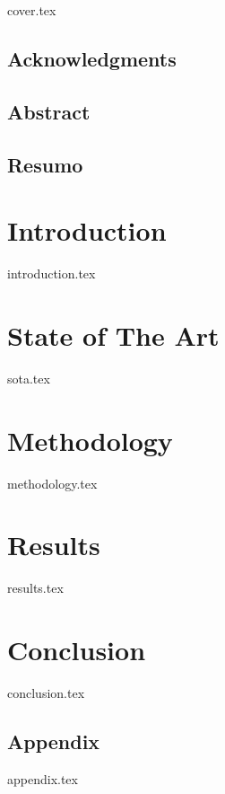 \documentclass[a4paper, 12pt]{report}
\begin{document}
{cover.tex}
\newpage
\printglossary[type=\acronymtype]

\newpage
\listoffigures

\newpage
\listoftables

\newpage
\tableofcontents
\frontmatter
\section*{Acknowledgments}

\newpage
\section*{Abstract}

\newpage
\section*{Resumo}

\mainmatter


\newpage
\chapter{Introduction}
{introduction.tex}

\newpage
\chapter{State of The Art}
{sota.tex}

\newpage
\chapter{Methodology}
{methodology.tex}

\newpage
\chapter{Results}
{results.tex}

\newpage
\chapter{Conclusion}
{conclusion.tex}

\newpage
\printbibliography

\newpage
\section*{Appendix}
{appendix.tex}
\end{document}
